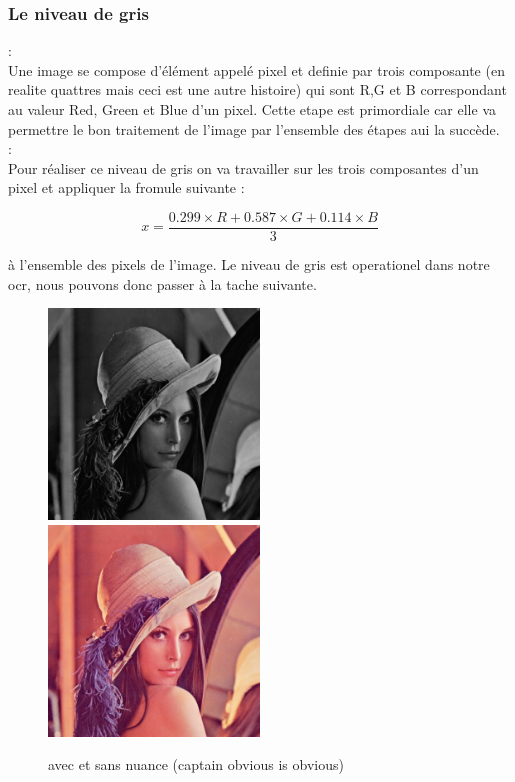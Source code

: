\documentclass[12pt]{article}
\begin{document}
\subsubsection{Le niveau de gris}
:\\
Une image se compose d'élément appelé pixel et definie par trois composante (en realite quattres mais ceci est une autre histoire) qui sont R,G et B correspondant au valeur Red, Green et Blue d'un pixel. Cette etape est primordiale car elle va permettre le bon traitement de l'image par l'ensemble des étapes aui la succède.\\
:\\
Pour réaliser ce niveau de gris on va travailler sur les trois composantes d'un pixel et appliquer la fromule suivante :
\\
\begin{center}
\[x = \frac{0.299 \times R + 0.587 \times G + 0.114 \times B}{3}\]
\end{center}
à l'ensemble des pixels de l'image. Le niveau de gris est operationel dans notre ocr, nous pouvons donc passer à la tache suivante.
\begin{figure}[h]
\includegraphics[width=0.50\textwidth]{img/grey.png}
\includegraphics[width=0.50\textwidth]{img/lena.jpg}
\caption{avec et sans nuance (captain obvious is obvious)}
\end{figure}
\newpage{}
\end{document}
